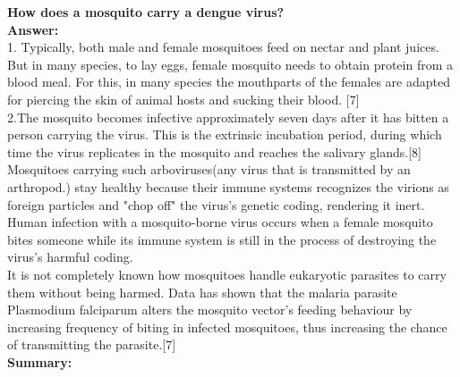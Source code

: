 \documentclass[11pt]{exam}
\begin{document}
\begin{questions}
\question
\label{4. Mosquito: A dengue vector}
\textbf{How does a mosquito carry a dengue virus?} \\
\textbf{Answer:} \\
1. Typically, both male and female mosquitoes feed on nectar and plant juices. But in many species, to lay eggs, female mosquito needs to obtain protein from a blood meal. For this, in many species the mouthparts of the females are adapted for piercing the skin of animal hosts and sucking their blood. [7]\\
2.The mosquito becomes infective approximately seven days after it has bitten a person carrying the virus. This is the extrinsic incubation period, during which time the virus replicates in the mosquito and reaches the salivary glands.[8] \\

Mosquitoes carrying such arboviruses(any virus that is transmitted by an arthropod.) stay healthy because their immune systems recognizes the virions as foreign particles and "chop off" the virus's genetic coding, rendering it inert. Human infection with a mosquito-borne virus occurs when a female mosquito bites someone while its immune system is still in the process of destroying the virus's harmful coding. \\
It is not completely known how mosquitoes handle eukaryotic parasites to carry them without being harmed. Data has shown that the malaria parasite Plasmodium falciparum alters the mosquito vector's feeding behaviour by increasing frequency of biting in infected mosquitoes, thus increasing the chance of transmitting the parasite.[7]\\
\textbf{Summary:} \\
\\ \\


\end{questions}
\end{document}
